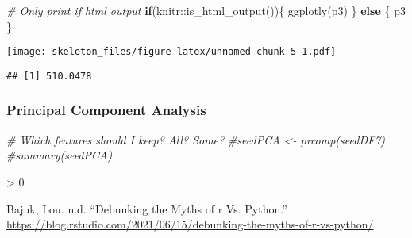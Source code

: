 \documentclass[
]{article}
\newenvironment{Shaded}{\begin{snugshade}}{\end{snugshade}}
\newcommand{\CommentTok}[1]{\textcolor[rgb]{0.56,0.35,0.01}{\textit{#1}}}
\newcommand{\ControlFlowTok}[1]{\textcolor[rgb]{0.13,0.29,0.53}{\textbf{#1}}}
\newcommand{\FunctionTok}[1]{\textcolor[rgb]{0.00,0.00,0.00}{#1}}
\newcommand{\NormalTok}[1]{#1}
\newcommand{\SpecialCharTok}[1]{\textcolor[rgb]{0.00,0.00,0.00}{#1}}
\newlength{\cslhangindent}
\newenvironment{CSLReferences}[2] %
 {%
  \setlength{\parindent}{0pt}
  \ifodd #1 \everypar{\setlength{\hangindent}{\cslhangindent}}\ignorespaces\fi
  \ifnum #2 > 0
  \setlength{\parskip}{#2\baselineskip}
  \fi
 }%
 {}
\begin{document}
\begin{Shaded}
\begin{Highlighting}[]
\CommentTok{\# Only print if html output}
\ControlFlowTok{if}\NormalTok{(knitr}\SpecialCharTok{::}\FunctionTok{is\_html\_output}\NormalTok{())\{}
  \FunctionTok{ggplotly}\NormalTok{(p3)}
\NormalTok{\} }\ControlFlowTok{else}\NormalTok{ \{}
\NormalTok{  p3}
\NormalTok{\}}
\end{Highlighting}
\end{Shaded}

\texttt{[image: skeleton\_files/figure-latex/unnamed-chunk-5-1.pdf]}

\begin{Shaded}
\end{Shaded}

\begin{verbatim}
## [1] 510.0478
\end{verbatim}

\hypertarget{principal-component-analysis}{%
\subsubsection{Principal Component
Analysis}\label{principal-component-analysis}}

\begin{Shaded}
\begin{Highlighting}[]
\CommentTok{\# Which features should I keep?  All? Some?}
\CommentTok{\#seedPCA \textless{}{-} prcomp(seedDF7)}
\CommentTok{\#summary(seedPCA)}
\end{Highlighting}
\end{Shaded}

\hypertarget{refs}{}
\begin{CSLReferences}{1}{0}
\leavevmode\hypertarget{ref-bajuk}{}%
Bajuk, Lou. n.d. {``Debunking the Myths of r Vs. Python.''}
\url{https://blog.rstudio.com/2021/06/15/debunking-the-myths-of-r-vs-python/}.

\end{CSLReferences}
\end{document}
